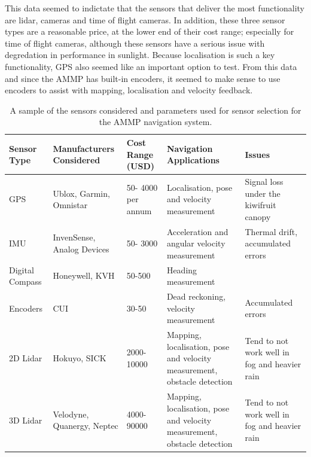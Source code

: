 \documentclass[preprint,authoryear,12pt]{elsarticle}
\begin{document}
    This data seemed to indictate that the sensors that deliver the most functionality are lidar, cameras and time of flight cameras. In addition, these three sensor types are a reasonable price, at the lower end of their cost range; especially for time of flight cameras, although these sensors have a serious issue with degredation in performance in sunlight. Because localisation is such a key functionality, GPS also seemed like an important option to test. From this data and since the AMMP has built-in encoders, it seemed to make sense to use encoders to assist with mapping, localisation and velocity feedback. 

    \begin{table}[h!]
    \label{table:2}
    \caption{A sample of the sensors considered and parameters used for sensor selection for the AMMP navigation system.}
    \centering
    \begin{tabular}{ | m{1.4cm} | m{2.9cm}| m{1.4cm} | m{2.9cm} | m{2.9cm} } 
    \hline
    \scriptsize \textbf{Sensor Type} & \scriptsize \textbf{Manufacturers Considered} &\scriptsize \textbf{Cost Range (USD)} &\scriptsize \textbf{Navigation Applications} &\scriptsize \textbf{Issues} \\
    \hline
    \scriptsize GPS & \scriptsize Ublox, Garmin, Omnistar & \scriptsize 50- 4000 per annum & \scriptsize Localisation, pose and velocity measurement &\scriptsize Signal loss under the kiwifruit canopy \\ 
    \hline
    \scriptsize IMU & \scriptsize InvenSense, Analog Devices & \scriptsize 50- 3000 & \scriptsize Acceleration and angular velocity measurement & \scriptsize Thermal drift, accumulated errors \\
    \hline
    \scriptsize Digital Compass & \scriptsize Honeywell, KVH & \scriptsize 50-500 & \scriptsize Heading measurement & \scriptsize \\
    \hline
    \scriptsize Encoders & \scriptsize CUI & \scriptsize 30-50 & \scriptsize Dead reckoning, velocity measurement & \scriptsize Accumulated errors \\
    \hline
    \scriptsize 2D Lidar & \scriptsize Hokuyo, SICK & \scriptsize 2000-10000 & \scriptsize Mapping, localisation, pose and velocity measurement, obstacle detection & \scriptsize Tend to not work well in fog and heavier rain \\
    \hline
    \scriptsize 3D Lidar & \scriptsize Velodyne, Quanergy, Neptec & \scriptsize 4000-90000 & \scriptsize Mapping, localisation, pose and velocity measurement, obstacle detection & \scriptsize Tend to not work well in fog and heavier rain \\

\end{tabular}
\end{table}
\end{document}
